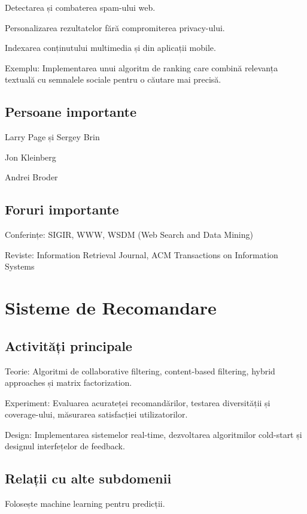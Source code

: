 \documentclass[12pt]{article}
\begin{document}
Detectarea și combaterea spam-ului web.

Personalizarea rezultatelor fără compromiterea privacy-ului.

Indexarea conținutului multimedia și din aplicații mobile.

Exemplu: Implementarea unui algoritm de ranking care combină relevanța textuală cu semnalele sociale pentru o căutare mai precisă.

\subsection*{Persoane importante}

Larry Page și Sergey Brin

Jon Kleinberg

Andrei Broder

\subsection*{Foruri importante}

Conferințe: SIGIR, WWW, WSDM (Web Search and Data Mining)

Reviste: Information Retrieval Journal, ACM Transactions on Information Systems

\section{Sisteme de Recomandare}

\subsection*{Activități principale}

Teorie: Algoritmi de collaborative filtering, content-based filtering, hybrid approaches și matrix factorization.

Experiment: Evaluarea acurateței recomandărilor, testarea diversității și coverage-ului, măsurarea satisfacției utilizatorilor.

Design: Implementarea sistemelor real-time, dezvoltarea algoritmilor cold-start și designul interfețelor de feedback.

\subsection*{Relații cu alte subdomenii}

Folosește machine learning pentru predicții.
\end{document}
